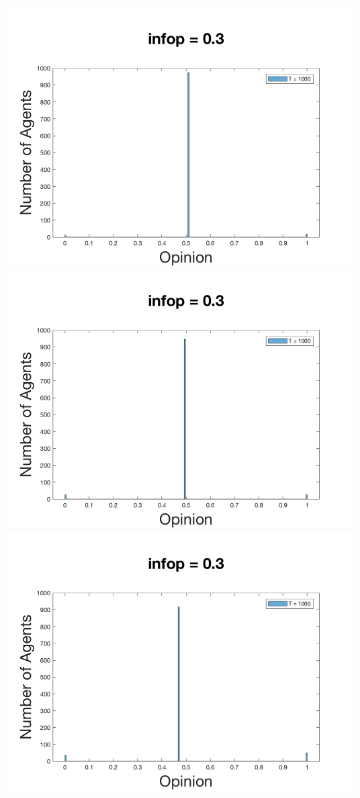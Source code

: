 \documentclass[11pt]{article}
\begin{document}
\begin{figure}[!htb]
\begin{subfigure}[!htb]{\textwidth}
  \includegraphics[width=\linewidth]{p_5/gen_plot_201712171365491110e+01.png}
\endminipage\hfill
{}
  \includegraphics[width=\linewidth]{p_10/gen_plot_2017121712593647221e+01.png}
\endminipage\hfill
{}
  \includegraphics[width=\linewidth]{p_20/gen_plot_201712171361653386e+01.png}
\endminipage
\end{subfigure}



\end{figure}
\end{document}
